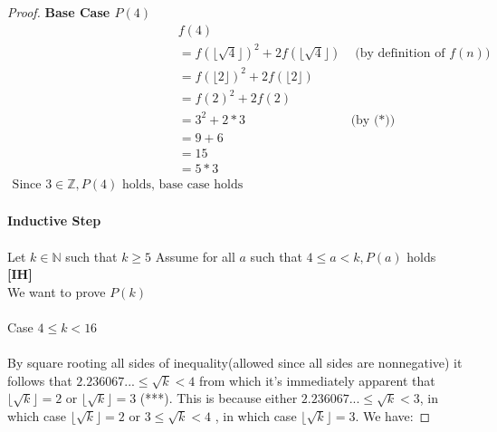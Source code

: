 \documentclass[12pt]{article}
\begin{document}
\begin{proof}
\textbf{Base Case $P(4)$}
\begin{align*}
&f(4)\\
&= f(\lfloor\sqrt{4}\rfloor)^{2} + 2f(\lfloor\sqrt{4}\rfloor) &\text{ (by definition of $f(n)$)}\\
& =f(\lfloor2\rfloor)^{2} + 2f(\lfloor2\rfloor)\\
& =f(2)^{2} + 2f(2)\\
& = 3^2 + 2*3  &\text{(by (*))}\\
& = 9 + 6\\
& = 15\\
& = 5 * 3\\
\text{Since $3 \in \mathbb{Z}, P(4)$ holds, base case holds}
\end{align*}\\
\textbf{Inductive Step}\\\\
Let $k \in \mathbb{N}$ such that $k \geq 5$
Assume for all $a$ such that $ 4 \leq a < k, P(a)$ holds \textbf{[IH]}\\We want to prove $P(k)$ \\\\
Case $ 4 \leq k < 16$\\\\
By square rooting all sides of inequality(allowed since all sides are nonnegative) it follows that
$2.236067... \leq \sqrt{k} < 4$ from which it's immediately apparent that $\lfloor\sqrt{k}\rfloor = 2$ or $\lfloor\sqrt{k}\rfloor = 3$ (***). This is because either $2.236067... \leq \sqrt{k} < 3$, in which case $\lfloor\sqrt{k}\rfloor = 2$ or $3 \leq \sqrt{k} < 4$ , in which case  $\lfloor\sqrt{k}\rfloor = 3$.  We have:


\end{proof}
\end{document}
